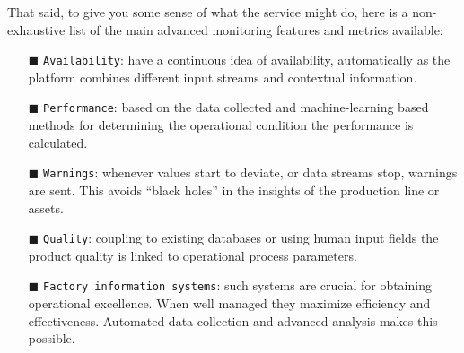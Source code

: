 That said, to give you some sense of what the service might do, here is a non-exhaustive list of the main advanced monitoring features and metrics available:
\begin{enumerate}
	\item[$\blacksquare$]\texttt{Availability}: have a continuous idea of availability, automatically as the platform combines different input streams and contextual information.
	\item[$\blacksquare$]\texttt{Performance}: based on the data collected and machine-learning based methods for determining the operational condition the performance is calculated.
	\item[$\blacksquare$]\texttt{Warnings}: whenever values start to deviate, or data streams stop, warnings are sent. This avoids ``black holes'' in the insights of the production line or assets.
	\item[$\blacksquare$]\texttt{Quality}: coupling to existing databases or using human input fields the product quality is linked to operational process parameters.
	\item[$\blacksquare$]\texttt{Factory information systems}: such systems are crucial for obtaining operational excellence. When well managed they maximize efficiency and effectiveness. Automated data collection and advanced analysis makes this possible.
\end{enumerate}
\clearpage